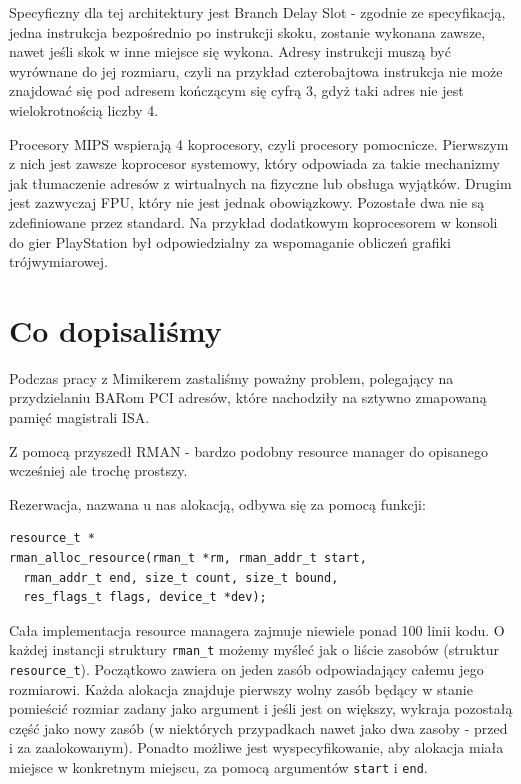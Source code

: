 \documentclass[shortabstract,inz]{iithesis}
\begin{document}
Specyficzny dla tej architektury jest Branch Delay Slot - zgodnie ze
specyfikacją, jedna instrukcja bezpośrednio po instrukcji skoku,
zostanie wykonana zawsze, nawet jeśli skok w inne miejsce się wykona.
Adresy instrukcji muszą być wyrównane do jej rozmiaru, czyli na
przykład czterobajtowa instrukcja nie może znajdować się pod adresem
kończącym się cyfrą 3, gdyż taki adres nie jest wielokrotnością liczby
4.

Procesory MIPS wspierają 4 koprocesory, czyli procesory
pomocnicze. Pierwszym z nich jest zawsze koprocesor systemowy,
który odpowiada za takie mechanizmy jak tłumaczenie adresów z
wirtualnych na fizyczne lub obsługa wyjątków. Drugim jest zazwyczaj
FPU, który nie jest jednak obowiązkowy. Pozostałe dwa nie są
zdefiniowane przez standard. Na przykład dodatkowym koprocesorem w
konsoli do gier PlayStation był odpowiedzialny za wspomaganie
obliczeń grafiki trójwymiarowej.


\section{Co dopisaliśmy} %
Podczas pracy z Mimikerem zastaliśmy poważny problem, polegający na 
przydzielaniu BARom PCI adresów, które nachodziły na sztywno 
zmapowaną pamięć magistrali ISA.

Z pomocą przyszedł RMAN - bardzo podobny resource manager do opisanego wcześniej ale trochę prostszy.

Rezerwacja, nazwana u nas alokacją, odbywa się za pomocą funkcji:
\begin{lstlisting}
resource_t *
rman_alloc_resource(rman_t *rm, rman_addr_t start, 
  rman_addr_t end, size_t count, size_t bound, 
  res_flags_t flags, device_t *dev);
\end{lstlisting}

Cała implementacja resource managera zajmuje niewiele ponad 100 linii kodu. O każdej instancji struktury 
\texttt{rman\_t} możemy myśleć jak o liście zasobów (struktur \texttt{resource\_t}). 
Początkowo zawiera on jeden zasób odpowiadający całemu jego rozmiarowi. Każda alokacja znajduje 
pierwszy wolny zasób będący w stanie pomieścić rozmiar zadany jako argument i jeśli jest on większy, 
wykraja pozostałą część jako nowy zasób (w niektórych przypadkach nawet jako dwa zasoby - przed i za 
zaalokowanym). Ponadto możliwe jest wyspecyfikowanie, aby alokacja miała miejsce w konkretnym miejscu, 
za pomocą argumentów \texttt{start} i  \texttt{end}.
\end{document}
